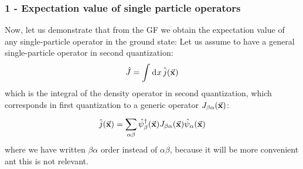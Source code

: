 \documentclass[../main/main.tex]{subfiles}
\begin{document}
\subsubsection{1 - Expectation value of single particle operators}
Now, let us demonstrate that from the GF we obtain the expectation value of any single-particle operator in the ground state: 
Let us assume to have a general single-particle operator in second quantization:
\begin{equation*}
  \hat{J} = \int_{}^{} \dd[]{x} \hat{j} (\va{x})
\end{equation*}
which is the integral of the density operator in second quantization, which corresponds in first quantization to a generic operator \( J_{\beta \alpha }(\va{x}) \):
\begin{equation*}
\hat{j} (\va{x})  = \sum_{\alpha  \beta }^{} \hat{\psi }_ \beta ^\dag  (\va{x}) J_{\beta \alpha } (\va{x}) \hat{\psi}_ \alpha (\va{x})
\end{equation*}
where we have written \( \beta \alpha  \) order instead of \( \alpha \beta  \), because it will be more convenient ant this is not relevant.
\end{document}
